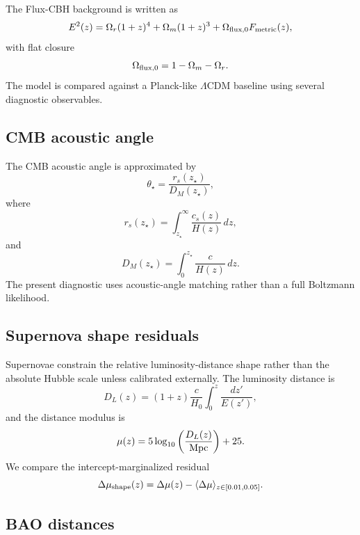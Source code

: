 \documentclass[11pt,a4paper]{article}
\newcommand{\LCDM}{\ensuremath{\Lambda\mathrm{CDM}}}
\begin{document}
The Flux-CBH background is written as
\begin{equation}
E^2(z)=\Omega_r(1+z)^4+\Omega_m(1+z)^3+\Omega_{{\rm flux},0}F_{\rm metric}(z),
\end{equation}
with flat closure
\begin{equation}
\Omega_{{\rm flux},0}=1-\Omega_m-\Omega_r.
\end{equation}
The model is compared against a Planck-like \LCDM{} baseline using several diagnostic observables.

\subsection{CMB acoustic angle}

The CMB acoustic angle is approximated by
\begin{equation}
\theta_\star=\frac{r_s(z_\star)}{D_M(z_\star)},
\end{equation}
where
\begin{equation}
r_s(z_\star)=\int_{z_\star}^{\infty}\frac{c_s(z)}{H(z)}\,dz,
\end{equation}
and
\begin{equation}
D_M(z_\star)=\int_0^{z_\star}\frac{c}{H(z)}\,dz.
\end{equation}
The present diagnostic uses acoustic-angle matching rather than a full Boltzmann likelihood.

\subsection{Supernova shape residuals}

Supernovae constrain the relative luminosity-distance shape rather than the absolute Hubble scale unless calibrated externally. The luminosity distance is
\begin{equation}
D_L(z)=(1+z)\frac{c}{H_0}\int_0^z\frac{dz'}{E(z')},
\end{equation}
and the distance modulus is
\begin{equation}
\mu(z)=5\log_{10}\left(\frac{D_L(z)}{\rm Mpc}\right)+25.
\end{equation}
We compare the intercept-marginalized residual
\begin{equation}
\Delta\mu_{\rm shape}(z)=\Delta\mu(z)-\langle\Delta\mu\rangle_{z\in[0.01,0.05]}.
\end{equation}

\subsection{BAO distances}
\end{document}
